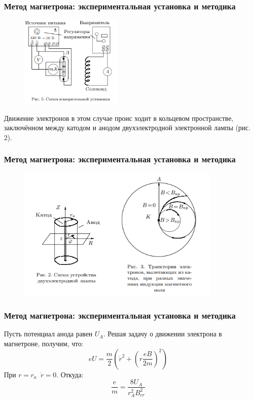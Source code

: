 \documentclass{beamer}
\begin{document}
\begin{frame}
\frametitle{Метод магнетрона: экспериментальная установка и методика}
\begin{figure}
	\includegraphics[width=5cm]{ris4.PNG}
	\label{ris:ris2}
\end{figure}
Движение электронов в этом случае проис
ходит в кольцевом пространстве, заключённом между
катодом
и анодом двухэлектродной электронной лампы (рис. 2). 
\end{frame}


\begin{frame}
\frametitle{Метод магнетрона: экспериментальная установка и методика}
\begin{figure}
	\includegraphics[width=10cm]{ris3.PNG}
	\label{ris:ris2}
\end{figure}
\end{frame}


\begin{frame}
\frametitle{Метод магнетрона: экспериментальная установка и методика}
Пусть потенциал анода равен $U_A$.
Решая задачу о движении электрона в магнетроне, получим, что:
\begin{equation}
    eU = \frac{m}{2} (\dot{r}^2 + (r\frac{eB}{2m})^2)
\end{equation}
При $r = r_a\;\;\dot{r} = 0.$ Откуда:
\begin{equation}
    \frac{e}{m} = \frac{8U_A}{r_A^2B_{cr}^2}
\end{equation}
\end{frame}
\end{document}
